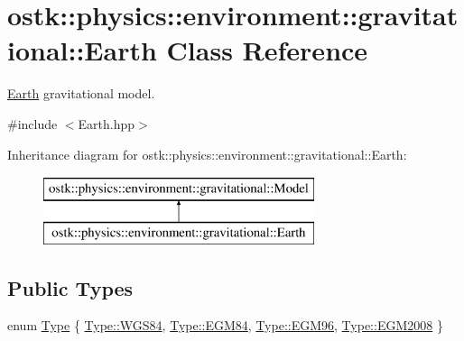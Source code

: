 \hypertarget{classostk_1_1physics_1_1environment_1_1gravitational_1_1_earth}{}\section{ostk\+:\+:physics\+:\+:environment\+:\+:gravitational\+:\+:Earth Class Reference}
\label{classostk_1_1physics_1_1environment_1_1gravitational_1_1_earth}


\hyperlink{classostk_1_1physics_1_1environment_1_1gravitational_1_1_earth}{Earth} gravitational model.  




{\ttfamily \#include $<$Earth.\+hpp$>$}

Inheritance diagram for ostk\+:\+:physics\+:\+:environment\+:\+:gravitational\+:\+:Earth\+:\begin{figure}[H]
\begin{center}
\leavevmode
\includegraphics[height=2.000000cm]{classostk_1_1physics_1_1environment_1_1gravitational_1_1_earth}
\end{center}
\end{figure}
\subsection*{Public Types}
\begin{DoxyCompactItemize}
\item 
enum \hyperlink{classostk_1_1physics_1_1environment_1_1gravitational_1_1_earth_a9895df78b5c5aab5e981bf765f8c0f05}{Type} \{ \hyperlink{classostk_1_1physics_1_1environment_1_1gravitational_1_1_earth_a9895df78b5c5aab5e981bf765f8c0f05a5dda43a21474cf33e7088b8247f19c4b}{Type\+::\+W\+G\+S84}, 
\hyperlink{classostk_1_1physics_1_1environment_1_1gravitational_1_1_earth_a9895df78b5c5aab5e981bf765f8c0f05a2ae5659e79a4bb66ae4ee8cb033ef196}{Type\+::\+E\+G\+M84}, 
\hyperlink{classostk_1_1physics_1_1environment_1_1gravitational_1_1_earth_a9895df78b5c5aab5e981bf765f8c0f05a7c7ad846cb98dafc9309087d3ba36013}{Type\+::\+E\+G\+M96}, 
\hyperlink{classostk_1_1physics_1_1environment_1_1gravitational_1_1_earth_a9895df78b5c5aab5e981bf765f8c0f05af22fbbe07f6feeaa3d6446dabcd8b164}{Type\+::\+E\+G\+M2008}
 \}
\end{DoxyCompactItemize}
